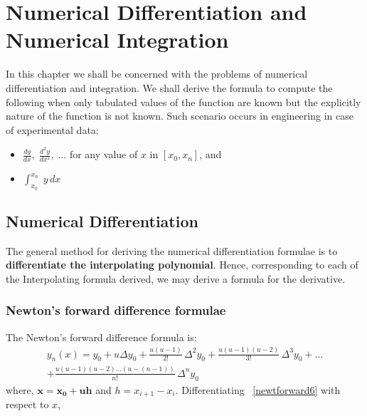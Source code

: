\documentclass[aima203_lecturenotes_ku.tex]{subfiles}
\begin{document}
\chapter{Numerical Differentiation and Numerical Integration}

In this chapter we shall be concerned with the problems of numerical differentiation and integration. We shall derive the formula to compute the following when only tabulated values of the function are known but the explicitly nature of the function is not known. Such scenario occurs in engineering in case of experimental data:

\begin{itemize}
\item $\displaystyle \frac{dy}{dx}, \; \frac{d^2y}{dx^2},\;...$ for any value of $x$ in $[x_0, x_n]$, and

\item $\displaystyle \int_{x_0}^{x_n} \; y\,dx$
\end{itemize}

\section{Numerical Differentiation}
The general method for deriving the numerical differentiation formulae is to \textbf{differentiate the interpolating polynomial}. Hence, corresponding to each of the Interpolating formula derived, we may derive a formula for the derivative.

\subsection{Newton's forward difference formulae}
The Newton's forward difference formula is:
\begin{equation}
  \label{newtforward6}
 \begin{gathered}
  y_n(x) = y_0 + u \Delta y_0 + \frac{u(u-1)}{2!}\, \Delta ^2 y_0 + \frac{u(u-1)(u-2)}{3!}\, \Delta ^3 y_0 + ... \\[1mm]
  + \frac{u(u-1)(u-2)...(u-(n-1))}{n!}\, \Delta ^n y_0
\end{gathered}
\end{equation}
where, $\mathbf{x=x_0 + uh}$ and $h = x_{i+1} - x_{i}$. Differentiating ~\ref{newtforward6} with respect to $x$,
\end{document}
